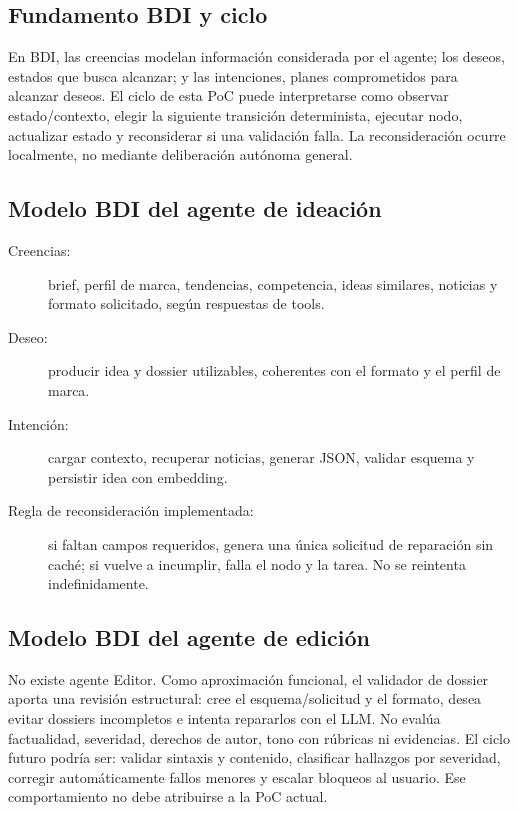\documentclass[12pt,oneside]{report}
\begin{document}
\setcounter{subsection}{0}
\subsection{Fundamento BDI y ciclo}
En BDI, las creencias modelan información considerada por el agente; los deseos, estados que busca alcanzar; y las intenciones, planes comprometidos para alcanzar deseos. El ciclo de esta PoC puede interpretarse como observar estado/contexto, elegir la siguiente transición determinista, ejecutar nodo, actualizar estado y reconsiderar si una validación falla. La reconsideración ocurre localmente, no mediante deliberación autónoma general.

\subsection{Modelo BDI del agente de ideación}
\begin{description}
  \item[Creencias:] brief, perfil de marca, tendencias, competencia, ideas similares, noticias y formato solicitado, según respuestas de tools.
  \item[Deseo:] producir idea y dossier utilizables, coherentes con el formato y el perfil de marca.
  \item[Intención:] cargar contexto, recuperar noticias, generar JSON, validar esquema y persistir idea con embedding.
  \item[Regla de reconsideración implementada:] si faltan campos requeridos, genera una única solicitud de reparación sin caché; si vuelve a incumplir, falla el nodo y la tarea. No se reintenta indefinidamente.
\end{description}

\subsection{Modelo BDI del agente de edición}
No existe agente Editor. Como aproximación funcional, el validador de dossier aporta una revisión estructural: cree el esquema/solicitud y el formato, desea evitar dossiers incompletos e intenta repararlos con el LLM. No evalúa factualidad, severidad, derechos de autor, tono con rúbricas ni evidencias. El ciclo futuro podría ser: validar sintaxis y contenido, clasificar hallazgos por severidad, corregir automáticamente fallos menores y escalar bloqueos al usuario. Ese comportamiento no debe atribuirse a la PoC actual.
\end{document}
